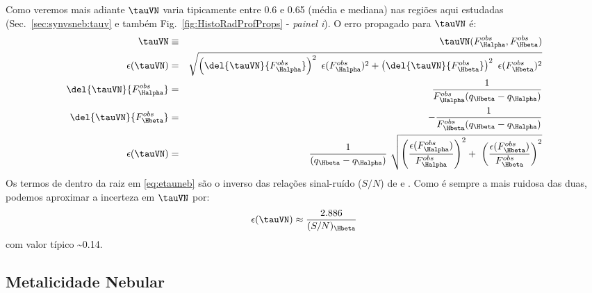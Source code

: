 Como veremos mais adiante $\tauVN$ varia tipicamente entre 0.6 e 0.65 (média e mediana) nas regiões aqui
estudadas (Sec.\ \ref{sec:synvsneb:tauv} e também Fig.\ \ref{fig:HistoRadProfProps}
- {\em painel i}). O erro propagado para $\tauVN$ é:
\begin{eqnarray}
	\tauVN &\equiv& \tauVN(F_{\Halpha}^{obs}, F_{\Hbeta}^{obs}) \\
	\epsilon (\tauVN) &=& \sqrt{\left(\del{\tauVN}{F_{\Halpha}^{obs}}\right)^2 \
\epsilon (F_{\Halpha}^{obs})^2 + \left(\del{\tauVN}{F_{\Hbeta}^{obs}}\right)^2 \
\epsilon (F_{\Hbeta}^{obs})^2 } \\
	\del{\tauVN}{F_{\Halpha}^{obs}} &=& \frac{1}{F_{\Halpha}^{obs} (q_{\Hbeta} - q_{\Halpha})} \\
	\del{\tauVN}{F_{\Hbeta}^{obs}} &=& - \frac{1}{F_{\Hbeta}^{obs} (q_{\Hbeta} - q_{\Halpha})} \\
	\epsilon (\tauVN) &=& \frac{1}{(q_{\Hbeta} - q_{\Halpha})} \
\sqrt{\left(\frac{\epsilon (F_{\Halpha}^{obs})}{F_{\Halpha}^{obs}}\right)^2 + \
\left(\frac{\epsilon (F_{\Hbeta}^{obs})}{F_{\Hbeta}^{obs}}\right)^2 }
	\label{eq:etauneb}
\end{eqnarray}
\noindent Os termos de dentro da raiz em \eqref{eq:etauneb} são o inverso das relações sinal-ruído
($S/N$) de \Halpha e \Hbeta. Como \Hbeta é sempre a mais ruidosa das duas, podemos aproximar a
incerteza em $\tauVN$ por:
\begin{equation}
	\epsilon (\tauVN) \approx \frac{2.886}{(S/N)_{\Hbeta}}
	\label{eq:etaunebaprox}
\end{equation}
\noindent com valor típico \sim 0.14.

\subsection{Metalicidade Nebular}
\label{sec:emline:datacube:Zneb}

